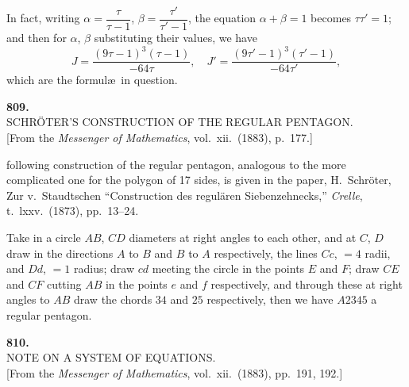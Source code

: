 \documentclass[11pt,a4paper]{article}
\providecommand{\textsc}[1]{{\scshape #1}}
\begin{document}
\medskip
In fact, writing $\alpha = \dfrac{\tau}{\tau - 1}$, $\beta = \dfrac{\tau'}{\tau' - 1}$, the equation $\alpha + \beta = 1$ becomes $\tau\tau' = 1$; and then for $\alpha$, $\beta$ substituting their values, we have
\[
J = \frac{(9\tau - 1)^{3}(\tau - 1)}{-64\tau},\quad J' = \frac{(9\tau' - 1)^{3}(\tau' - 1)}{-64\tau'},
\]
which are the formul\ae\ in question.
\clearpage

\fancyhead[L]{\small 809]}
\fancyhead[C]{\small\ }

\thispagestyle{plain}
\begin{center}
\vspace*{2em}
{\Large\bfseries 809.}\\[1.5em]
{\normalsize\scshape SCHR\"OTER'S CONSTRUCTION OF THE REGULAR PENTAGON.}\\[1em]
{\small [From the \textit{Messenger of Mathematics}, vol.~xii.\ (1883), p.~177.]}
\end{center}

\medskip
\noindent \textsc{The} following construction of the regular pentagon, analogous to the more complicated one for the polygon of 17 sides, is given in the paper, H.\ Schr\"oter, Zur v.\ Staudtschen ``Construction des regul\"aren Siebenzehnecks,'' \textit{Crelle}, t.~lxxv.\ (1873), pp.~13--24.

\medskip
Take in a circle $AB$, $CD$ diameters at right angles to each other, and at $C$, $D$ draw in the directions $A$ to $B$ and $B$ to $A$ respectively, the lines $Cc$, $= 4$ radii, and $Dd$, $= 1$ radius; draw $cd$ meeting the circle in the points $E$ and $F$; draw $CE$ and $CF$ cutting $AB$ in the points $e$ and $f$ respectively, and through these at right angles to $AB$ draw the chords $34$ and $25$ respectively, then we have $A2345$ a regular pentagon.
\clearpage

\fancyhead[C]{\small\ }
\fancyhead[R]{\small [810}

\thispagestyle{plain}
\begin{center}
\vspace*{2em}
{\Large\bfseries 810.}\\[1.5em]
{\normalsize\scshape NOTE ON A SYSTEM OF EQUATIONS.}\\[1em]
{\small [From the \textit{Messenger of Mathematics}, vol.~xii.\ (1883), pp.~191, 192.]}
\end{center}
\end{document}
